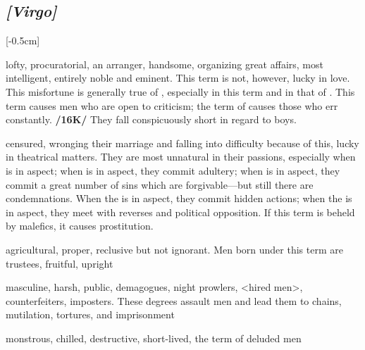 \subsection{\textit{[Virgo]}}
\marginnote{\Virgo}[-0.5cm]
\vspace{-1mm}
\begin{description}[labelindent=0em , labelwidth=1em, labelsep=1em, leftmargin =!]
\item[\Mercury]
	[0-6] lofty, procuratorial, an arranger, handsome, organizing great affairs, most intelligent, entirely noble and eminent. This term is not, however, lucky in love. This
misfortune is generally true of \Virgo, especially in this term and in that of \Venus. This term causes men who are open to criticism; the term of \Venus\xspace causes those who err constantly. \textbf{/16K/} They fall conspicuously short in regard to boys.
\item[	\Venus]
	[7-16] censured, wronging their marriage and falling into difficulty because of this, lucky in theatrical matters. They are most unnatural in their passions, especially when \Saturn\xspace is in aspect; when \Mercury\xspace is in aspect, they commit adultery; when \Jupiter\xspace is in aspect, they commit a great number of sins which are forgivable—but still there are condemnations. When the \Sun\xspace is in aspect, they commit hidden actions; when the \Moon\xspace is in aspect, they meet with reverses and political opposition. If this term is beheld by malefics, it causes prostitution.
\item[\Jupiter]
	[17-20] agricultural, proper, reclusive but not ignorant. Men born under this term are trustees, fruitful, upright
\item[\Mars]
	[21-27] masculine, harsh, public,
demagogues, night prowlers, <hired men>, counterfeiters, imposters. These degrees assault men and lead them to chains, mutilation, tortures, and imprisonment	
\item[\Saturn]
	[28-29] monstrous, chilled, destructive, short-lived, the term of deluded men
\end{description}

